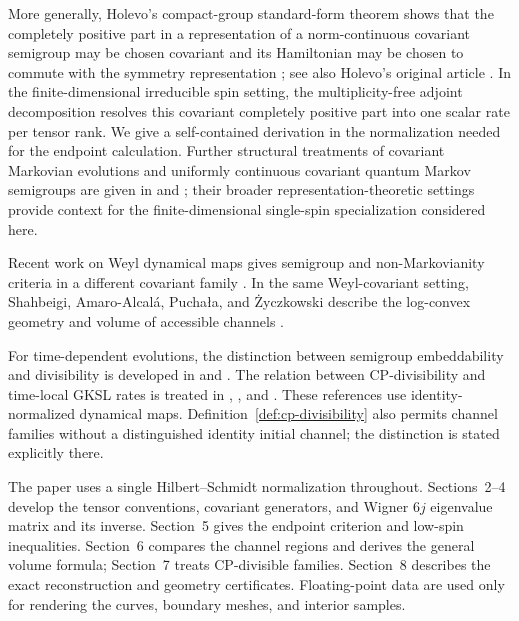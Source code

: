 \documentclass[twoside,10pt]{article}
\numberwithin{equation}{section}
\theoremstyle{slbody}
\theoremstyle{definition}
\theoremstyle{remark}
\begin{document}
More generally, Holevo's compact-group standard-form theorem shows that the
completely positive part in a representation of a norm-continuous covariant
semigroup may be chosen covariant and its Hamiltonian may be chosen to
commute with the symmetry representation
\cite[Sec.~3.3.4, Theorem~3.3.5]{Holevo2001}; see also Holevo's original
article \cite[p.~211]{Holevo1993}.  In the finite-dimensional irreducible spin
setting, the multiplicity-free adjoint decomposition resolves this
covariant completely positive part into one scalar rate per tensor rank.
We give a self-contained derivation in the normalization needed for the
endpoint calculation.
Further structural treatments of covariant Markovian evolutions and
uniformly continuous covariant quantum Markov semigroups are given in
\cite[p.~1812]{Holevo1996} and
\cite[Secs.~3--5]{GinattaSassoUmanita2019}; their broader
representation-theoretic settings provide context for the finite-dimensional
single-spin specialization considered here.

Recent work on Weyl dynamical
maps gives semigroup and non-Markovianity criteria in a different
covariant family \cite[Proposition~2]{XuJagadish2026}.
In the same Weyl-covariant setting, Shahbeigi, Amaro-Alcal{\'a},
Pucha{\l}a, and \.{Z}yczkowski describe the log-convex geometry and
volume of accessible channels
\cite[Corollary~4, Sec.~IV, and Eq.~(68)]{ShahbeigiEtAl2021}.

For time-dependent evolutions, the distinction between semigroup
embeddability and divisibility is developed in
\cite[Secs.~2--4]{WolfCirac2008} and \cite[Sec.~3]{DavalosZimanPineda2019}.
The relation between CP-divisibility and time-local GKSL rates is treated in
\cite[especially Eqs.~(1)--(2)]{RivasHuelgaPlenio2010},
\cite[Secs.~II--III]{HallCresserLiAndersson2014}, and
\cite[Secs.~2--3]{MontesCabreraDavalosGorin2019}.  These references use
identity-normalized dynamical maps.  Definition~\ref{def:cp-divisibility}
also permits channel families without a distinguished identity initial
channel; the distinction is stated explicitly there.

The paper uses a single Hilbert--Schmidt normalization throughout.
Sections~2--4 develop the tensor conventions, covariant generators, and
Wigner \(6j\) eigenvalue matrix and its inverse.  Section~5 gives the
endpoint criterion and low-spin inequalities.  Section~6 compares the
channel regions and derives the general volume formula; Section~7 treats
CP-divisible families.  Section~8 describes the exact reconstruction and
geometry certificates.  Floating-point data are used only for rendering
the curves, boundary meshes, and interior samples.
\end{document}
